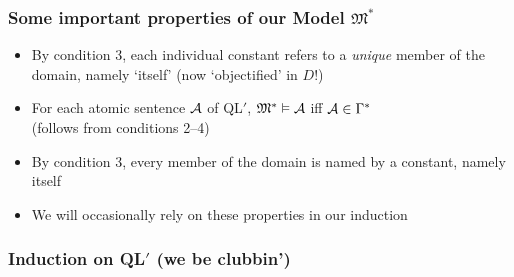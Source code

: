 \begin{frame}
\frametitle{Some important properties of our Model $\mathfrak{M}^{\ast}$}

\begin{itemize}[<+->]

\item By condition 3, each individual constant refers to a \textit{unique} member of the domain, namely `itself' (now `objectified' in $D$!)

\item For each atomic sentence $\mathcal{A}$ of QL$'$, $\mathfrak{M}^{\ast} \vDash \mathcal{A}$ iff $\mathcal{A} \in \Gamma^{\ast}$ \\ (follows from conditions 2--4)

\item By condition 3, every member of the domain is named by a constant, namely itself


\item We will occasionally rely on these properties in our induction






\end{itemize}
\end{frame}

\subsubsection{Induction on QL$'$ (we be clubbin')}

